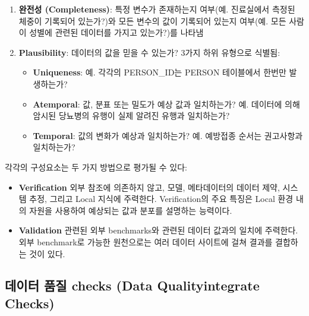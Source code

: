 \documentclass[11pt]{book}
\providecommand{\tightlist}{%
  \setlength{\itemsep}{0pt}\setlength{\parskip}{0pt}}
\theoremstyle{definition}
\theoremstyle{definition}
\theoremstyle{definition}
\theoremstyle{remark}
\begin{document}
\begin{enumerate}
\def\labelenumi{\arabic{enumi}.}
\setcounter{enumi}{1}
\tightlist
\item
  \textbf{완전성 (Completeness)}: 특정 변수가 존재하는지 여부(예.
  진료실에서 측정된 체중이 기록되어 있는가?)와 모든 변수의 값이 기록되어
  있는지 여부(예. 모든 사람이 성별에 관련된 데이터를 가지고 있는가?)를
  나타냄
\item
  \textbf{Plausibility}: 데이터의 값을 믿을 수 있는가? 3가지 하위
  유형으로 식별됨:

  \begin{itemize}
  \tightlist
  \item
    \textbf{Uniqueness}: 예. 각각의 PERSON\_ID는 PERSON 테이블에서
    한번만 발생하는가?
  \item
    \textbf{Atemporal}: 값, 분표 또는 밀도가 예상 값과 일치하는가? 예.
    데이터에 의해 암시된 당뇨병의 유행이 실제 알려진 유행과 일치하는가?
  \item
    \textbf{Temporal}: 값의 변화가 예상과 일치하는가? 예. 예방접종
    순서는 권고사항과 일치하는가?
  \end{itemize}

   
\end{enumerate}

각각의 구성요소는 두 가지 방법으로 평가될 수 있다:

\begin{itemize}
\tightlist
\item
  \textbf{Verification} 외부 참조에 의존하지 않고, 모델, 메타데이터의
  데이터 제약, 시스템 추정, 그리고 Local 지식에 주력한다. Verification의
  주요 특징은 Local 환경 내의 자원을 사용하여 예상되는 값과 분포를
  설명하는 능력이다.
\item
  \textbf{Validation} 관련된 외부 benchmarks와 관련된 데이터 값과의
  일치에 주력한다. 외부 benchmark로 가능한 원천으로는 여러 데이터
  사이트에 걸쳐 결과를 결합하는 것이 있다.
\end{itemize}

 

\subsection{데이터 품질 checks (Data Qualityintegrate
Checks)}\label{--checks-data-qualityintegrate-checks}

 
\end{document}
